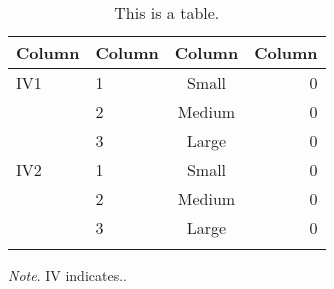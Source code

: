 \begin{table}[b!]
  \begin{center}
    \caption{This is a table.}
    \label{tab:table1}
    \footnotesize
    \begin{tabular}{llcr}
      \textbf{Column} & \textbf{Column} & \textbf{Column} & \textbf{Column}\\      
      \hline
      \addlinespace[1ex]
      IV1
      & 1 & Small  & 0 \\
      & 2 & Medium & 0 \\
      & 3 & Large  & 0  \\
      IV2
      & 1 & Small  & 0 \\
      & 2 & Medium & 0 \\
      & 3 & Large  & 0 \\
      \addlinespace[1ex]
      \hline
    \end{tabular}
    
    \bigskip
    \footnotesize\textit{Note}. IV indicates..
  \end{center}
\end{table}